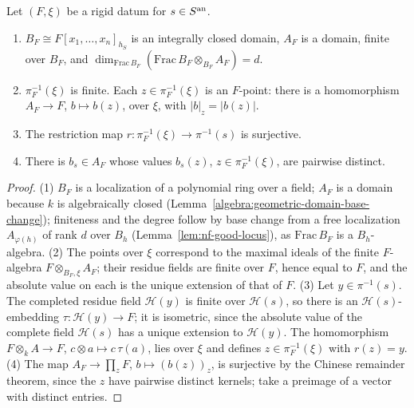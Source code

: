 \begin{lemma}\label{lem:nf-rigid-fibre}
\leanok
{}
Let $(F,\xi)$ be a rigid datum for $s\in S^{\mathrm{an}}$.
\begin{enumerate}
\item $B_F\cong F[x_1,\dots,x_n]_{h_S}$ is an integrally closed domain, $A_F$ is a domain, finite over $B_F$, and
$\dim_{\mathrm{Frac}\,B_F}(\mathrm{Frac}\,B_F\otimes_{B_F}A_F)=d$.
\item $\pi_F^{-1}(\xi)$ is finite. Each $z\in\pi_F^{-1}(\xi)$ is an $F$-point: there is a homomorphism
$A_F\to F$, $b\mapsto b(z)$, over $\xi$, with $|b|_z=|b(z)|$.
\item The restriction map $r\colon\pi_F^{-1}(\xi)\to\pi^{-1}(s)$ is surjective.
\item There is $b_s\in A_F$ whose values $b_s(z)$, $z\in\pi_F^{-1}(\xi)$, are pairwise distinct.
\end{enumerate}
\end{lemma}

\begin{proof}
(1) $B_F$ is a localization of a polynomial ring over a field; $A_F$ is a domain because $k$ is algebraically closed
(Lemma~\ref{algebra:geometric-domain-base-change}); finiteness and the degree follow by base change from a free
localization $A_{\varphi(h)}$ of rank $d$ over $B_h$ (Lemma~\ref{lem:nf-good-locus}), as $\mathrm{Frac}\,B_F$ is a
$B_h$-algebra. (2) The points over $\xi$ correspond to the maximal ideals of the finite $F$-algebra
$F\otimes_{B_F,\xi}A_F$; their residue fields are finite over $F$, hence equal to $F$, and the absolute value on each is
the unique extension of that of $F$. (3) Let $y\in\pi^{-1}(s)$. The completed residue field $\mathcal H(y)$ is finite
over $\mathcal H(s)$, so there is an $\mathcal H(s)$-embedding $\tau\colon\mathcal H(y)\to F$; it is isometric, since the
absolute value of the complete field $\mathcal H(s)$ has a unique extension to $\mathcal H(y)$. The homomorphism
$F\otimes_kA\to F$, $c\otimes a\mapsto c\,\tau(a)$, lies over $\xi$ and defines $z\in\pi_F^{-1}(\xi)$ with $r(z)=y$.
(4) The map $A_F\to\prod_zF$, $b\mapsto(b(z))_z$, is surjective by the Chinese remainder theorem, since the $z$ have
pairwise distinct kernels; take a preimage of a vector with distinct entries.
\end{proof}

